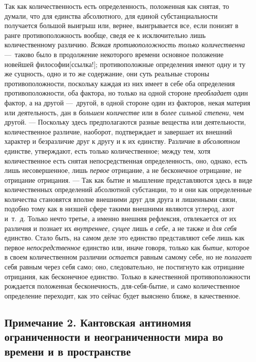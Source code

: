 {Так как количественность есть определенность, положенная как снятая, то
думали, что для единства абсолютного, для единой субстанциальности
получается большой выигрыш или, вернее, выигрывается все, если понизят в
ранге противоположность вообще, сведя ее к исключительно лишь
количественному различию. {\em Всякая противоположность
только количественна} —~таково было в продолжение некоторого времени
основное положение новейшей
философии[ссылка!]; противоположные
определения имеют одну и ту же сущность, одно и то же содержание, они суть
реальные стороны противоположности, поскольку каждая из них имеет в себе
оба определения противоположности, оба фактора, но только на одной стороне
{\em преобладает} один фактор, а на другой —~другой, в
одной стороне один из факторов, некая материя или деятельность, дан в
{\em большем количестве} или в
{\em более сильной степени}, чем другой. — Поскольку
здесь предполагаются разные вещества или деятельности, количественное
различие, наоборот, подтверждает и завершает их внешний характер и
безразличие друг к другу и к их единству. Различие в
{\em абсолютном} единстве, утверждают, есть только
количественное; между тем, хотя количественное есть снятая непосредственная
определенность, оно, однако, есть лишь несовершенное, лишь
{\em первое} отрицание, а не бесконечное отрицание, не
отрицание отрицания. — Так как бытие и мышление представляются здесь в виде
количественных определений абсолютной субстанции, то и они как определенные
количества становятся вполне внешними друг для друга и лишенными связи,
подобно тому как в низшей сфере такими внешними являются углерод, азот
и~т.~д. Только нечто третье, а именно внешняя рефлексия, отвлекается от их
различия и познает их {\em внутреннее, сущее} лишь
{\em в себе}, а не также и {\em для
себя} единство. Стало быть, на самом деле это единство представляют себе
лишь как первое {\em непосредственное} единство или,
иначе говоря, только как {\em бытие}, которое в своем
количественном различии {\em остается} равным самому
себе, но не {\em полагает} себя равным через себя само;
оно, следовательно, не постигнуто как отрицание отрицания, как бесконечное
единство. Только в качественной противоположности рождается положенная
бесконечность, для-себя-бытие, и само количественное определение переходит,
как это сейчас будет выяснено ближе, в качественное.

\bigskip

\subsection*{Примечание 2. Кантовская антиномия ограниченности и
неограниченности мира во времени и в пространстве}

}
